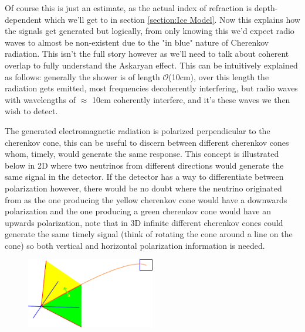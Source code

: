 \documentclass[11pt,a4paper,faculty=we,language=en,doctype=report]{cls/ugent-doc}
\begin{document}
Of course this is just an estimate, as the actual index of refraction is depth-dependent which
we'll get to in section \ref{section:Ice Model}.
Now this explains how the signals get generated but logically, from only knowing this
we'd expect radio waves to almost be non-existent 
due to the "in blue" nature of Cherenkov radiation. 
This isn't the full story however as we'll need to talk about coherent overlap
to fully understand the Askaryan effect. This can be intuitively explained as
follows: generally the shower is of length
$\mathcal{O}$(10cm)\cite{Huege_2017}, over this length the radiation gets
emitted, most frequencies decoherently interfering, but radio waves with wavelengths of 
$\approx$ 10cm coherently interfere, and it's these waves we then wish to detect.


The generated electromagnetic radiation is polarized perpendicular to the
cherenkov cone, this can be useful to discern between different cherenkov cones whom,
timely, would generate the same response. This concept is illustrated below in 2D where
two neutrinos from different directions would generate the same signal in the detector.
If the detector has a way to differentiate between polarization however, there would be no
doubt where the neutrino originated from as the one producing the yellow cherenkov cone
would have a downwards polarization and the one producing a green cherenkov cone would have
an upwards polarization, note that in 3D infinite different cherenkov cones could generate
the same timely signal (think of rotating the cone around a line on the cone) so both vertical
and horizontal polarization information is needed.
\begin{figure}[h!]
	\centering
	\includegraphics[width=0.5\textwidth]{illu_polarization.pdf}
\end{figure}
\end{document}
